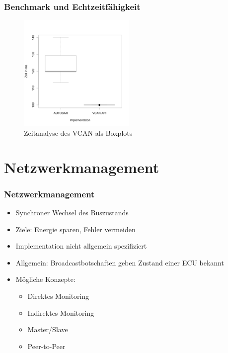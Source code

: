 \documentclass[]{beamer}
\begin{document}
\begin{frame}
\frametitle{Benchmark und Echtzeitfähigkeit}
    \begin{figure}
        \centering
        \includegraphics[width=0.5\textwidth]{boxplot}
        \caption[Zeitanalyse des VCAN als Boxplots]{Zeitanalyse des VCAN als Boxplots}
        \label{fig:timinganalyse}
    \end{figure}
\end{frame}

\section*{Netzwerkmanagement}
\label{sec:NM_anhang}

\begin{frame}
\frametitle{Netzwerkmanagement}
    \begin{itemize}
        \item Synchroner Wechsel des Buszustands
        \item Ziele: Energie sparen, Fehler vermeiden
        \item Implementation nicht allgemein spezifiziert
        \item Allgemein: Broadcastbotschaften geben Zustand einer ECU bekannt
        \item Mögliche Konzepte:
        \begin{itemize}
            \item Direktes Monitoring
            \item Indirektes Monitoring
            \item Master/Slave
            \item Peer-to-Peer
        \end{itemize}
    \end{itemize}
\end{frame}
\end{document}
